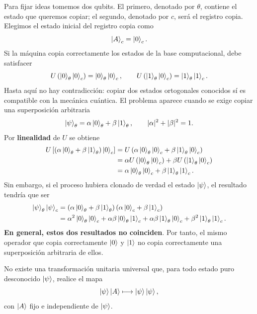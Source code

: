 \documentclass[../main.tex]{subfiles}
\begin{document}
Para fijar ideas tomemos dos qubits. El primero, denotado por $\theta$, contiene el estado que queremos copiar; el segundo, denotado por $c$, será el registro copia. Elegimos el estado inicial del registro copia como
\begin{equation*}
    \ket{A}_c=\ket{0}_c.
\end{equation*}
Si la máquina copia correctamente los estados de la base computacional, debe satisfacer
\begin{equation*}
    U\left(\ket{0}_\theta\ket{0}_c\right)
    =
    \ket{0}_\theta\ket{0}_c,
    \qquad
    U\left(\ket{1}_\theta\ket{0}_c\right)
    =
    \ket{1}_\theta\ket{1}_c.
\end{equation*}
Hasta aquí no hay contradicción: copiar dos estados ortogonales conocidos sí es compatible con la mecánica cuántica. El problema aparece cuando se exige copiar una superposición arbitraria
\begin{equation*}
    \ket{\psi}_\theta=\alpha\ket{0}_\theta+\beta\ket{1}_\theta,
    \qquad
    |\alpha|^2+|\beta|^2=1.
\end{equation*}
Por \textbf{linealidad} de $U$ se obtiene
\begin{align*}
    U\left[\left(\alpha\ket{0}_\theta+\beta\ket{1}_\theta\right)\ket{0}_c\right]
    &=U\left(\alpha\ket{0}_\theta\ket{0}_c+
    \beta\ket{1}_\theta\ket{0}_c\right)\\
    &=\alpha U\left(\ket{0}_\theta\ket{0}_c\right)
    +\beta U\left(\ket{1}_\theta\ket{0}_c\right)\\
    &=\alpha\ket{0}_\theta\ket{0}_c+
    \beta\ket{1}_\theta\ket{1}_c.
\end{align*}
Sin embargo, si el proceso hubiera clonado de verdad el estado $\ket{\psi}$, el resultado tendría que ser
\begin{align*}
    \ket{\psi}_\theta\ket{\psi}_c
    &=
    \left(\alpha\ket{0}_\theta+\beta\ket{1}_\theta\right)
    \left(\alpha\ket{0}_c+\beta\ket{1}_c\right)\\
    &=
    \alpha^2\ket{0}_\theta\ket{0}_c
    +\alpha\beta\ket{0}_\theta\ket{1}_c
    +\alpha\beta\ket{1}_\theta\ket{0}_c
    +\beta^2\ket{1}_\theta\ket{1}_c.
\end{align*}
\textbf{En general, estos dos resultados no coinciden}. Por tanto, el mismo operador que copia correctamente $\ket{0}$ y $\ket{1}$ no copia correctamente una superposición arbitraria de ellos.

\begin{teorema}[No-cloning]
No existe una transformación unitaria universal que, para todo estado puro desconocido $\ket{\psi}$, realice el mapa
\begin{equation*}
    \ket{\psi}\ket{A}\longmapsto \ket{\psi}\ket{\psi},
\end{equation*}
con $\ket{A}$ fijo e independiente de $\ket{\psi}$.
\end{teorema}
\end{document}
